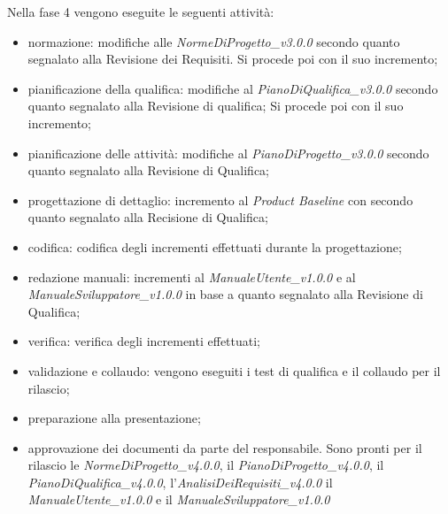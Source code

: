 Nella fase 4 vengono eseguite le seguenti attività:
\begin{itemize}
	\item normazione: modifiche alle \textit{NormeDiProgetto\_v3.0.0} secondo quanto segnalato alla Revisione dei Requisiti. Si procede poi con il suo incremento;
	\item pianificazione della qualifica: modifiche al \textit{PianoDiQualifica\_v3.0.0} secondo quanto segnalato alla Revisione di qualifica; Si procede poi con il suo incremento;
	\item pianificazione delle attività: modifiche al \textit{PianoDiProgetto\_v3.0.0} secondo quanto segnalato alla Revisione di Qualifica;
	\item progettazione di dettaglio: incremento al \textit{Product Baseline} con secondo quanto segnalato alla Recisione di Qualifica;
	\item codifica: codifica degli incrementi effettuati durante la progettazione;
	\item redazione manuali: incrementi al \textit{ManualeUtente\_v1.0.0} e al \textit{ManualeSviluppatore\_v1.0.0} in base a quanto segnalato alla Revisione di Qualifica;
	\item verifica: verifica degli incrementi effettuati;
	\item validazione e collaudo: vengono eseguiti i test di qualifica e il collaudo per il rilascio;
	\item preparazione alla presentazione;
	\item approvazione dei documenti da parte del responsabile. Sono pronti per il rilascio le \textit{NormeDiProgetto\_v4.0.0}, il \textit{PianoDiProgetto\_v4.0.0}, il \textit{PianoDiQualifica\_v4.0.0}, l'\textit{AnalisiDeiRequisiti\_v4.0.0} il
	\textit{ManualeUtente\_v1.0.0} e il \textit{ManualeSviluppatore\_v1.0.0}
\end{itemize}

